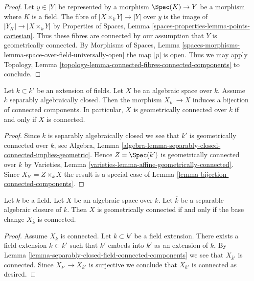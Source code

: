 \begin{proof}
Let $y \in |Y|$ be represented by a morphism $\Spec(K) \to Y$ be a morphism
where $K$ is a field. The fibre of $|X \times_k Y| \to |Y|$ over $y$
is the image of $|Y_K| \to |X \times_k Y|$ by
Properties of Spaces, Lemma \ref{spaces-properties-lemma-points-cartesian}.
Thus these fibres are connected by our assumption that $Y$ is
geometrically connected. By
Morphisms of Spaces, Lemma
\ref{spaces-morphisms-lemma-space-over-field-universally-open}
the map $|p|$ is open.
Thus we may apply Topology,
Lemma \ref{topology-lemma-connected-fibres-connected-components}
to conclude.
\end{proof}

\begin{lemma}
\label{lemma-separably-closed-field-connected-components}
Let $k \subset k'$ be an extension of fields. Let $X$ be an algebraic space
over $k$. Assume $k$ separably algebraically closed. Then the morphism
$X_{k'} \to X$ induces a bijection of connected components. In particular,
$X$ is geometrically connected over $k$ if and only if $X$ is connected.
\end{lemma}

\begin{proof}
Since $k$ is separably algebraically closed we see that
$k'$ is geometrically connected over $k$, see
Algebra,
Lemma \ref{algebra-lemma-separably-closed-connected-implies-geometric}.
Hence $Z = \Spec(k')$ is geometrically connected over $k$ by
Varieties, Lemma \ref{varieties-lemma-affine-geometrically-connected}.
Since $X_{k'} = Z \times_k X$ the result is a special case of
Lemma \ref{lemma-bijection-connected-components}.
\end{proof}

\begin{lemma}
\label{lemma-characterize-geometrically-connected}
Let $k$ be a field. Let $X$ be an algebraic space over $k$.
Let $\overline{k}$ be a separable algebraic closure of $k$.
Then $X$ is geometrically connected if and only if the base change
$X_{\overline{k}}$ is connected.
\end{lemma}

\begin{proof}
Assume $X_{\overline{k}}$ is connected. Let $k \subset k'$ be a field
extension. There exists a field extension $\overline{k} \subset \overline{k}'$
such that $k'$ embeds into $\overline{k}'$ as an extension of $k$.
By Lemma \ref{lemma-separably-closed-field-connected-components}
we see that $X_{\overline{k}'}$ is connected.
Since $X_{\overline{k}'} \to X_{k'}$ is surjective we conclude
that $X_{k'}$ is connected as desired.
\end{proof}

